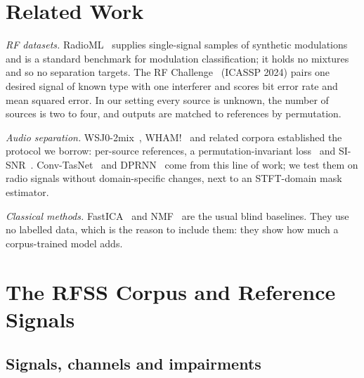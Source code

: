 \documentclass[conference]{IEEEtran}
\begin{document}
\section{Related Work}

\textit{RF datasets.} RadioML~\cite{oshea2016radio} supplies single-signal samples of synthetic modulations
and is a standard benchmark for modulation classification; it holds no mixtures and so no separation targets.
The RF Challenge~\cite{lancho2024rfchallenge} (ICASSP 2024) pairs one desired signal of known type with one
interferer and scores bit error rate and mean squared error. In our setting every source is unknown, the number
of sources is two to four, and outputs are matched to references by permutation.

\textit{Audio separation.} WSJ0-2mix~\cite{hershey2016deep}, WHAM!~\cite{wichern2019wham} and related corpora
established the protocol we borrow: per-source references, a permutation-invariant loss~\cite{kolbaek2017multitalker}
and SI-SNR~\cite{leroux2019sdr}. Conv-TasNet~\cite{luo2019conv} and DPRNN~\cite{luo2020dual} come from this
line of work; we test them on radio signals without domain-specific changes, next to an STFT-domain mask estimator.

\textit{Classical methods.} FastICA~\cite{hyvarinen2000ica} and NMF~\cite{fevotte2011nmf} are the usual blind baselines.
They use no labelled data, which is the reason to include them: they show how much a corpus-trained model adds.

\section{The RFSS Corpus and Reference Signals}
\label{sec:data}

\subsection{Signals, channels and impairments}
\end{document}

